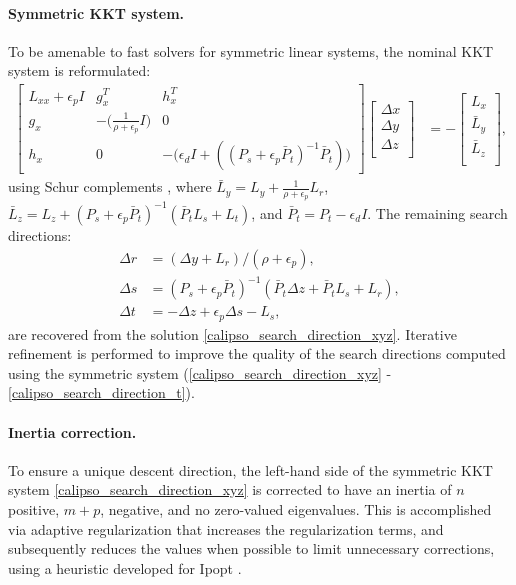 \paragraph{Symmetric KKT system.}
To be amenable to fast solvers for symmetric linear systems, the nominal KKT system is reformulated:
\begin{align} 
	\begin{bmatrix} 
		L_{xx} + \epsilon_p I & g_x^T & h_x^T \\ 
		g_x & -\Big(\frac{1}{\rho + \epsilon_p} I \Big) & 0 \\ 
		h_x & 0 & -\Big(\epsilon_d I + ((P_s + \epsilon_p \bar{P}_t)^{-1} \bar{P}_t) \Big)
	\end{bmatrix} 
	\begin{bmatrix} 
		\Delta x \\ 
		\Delta y \\ 
		\Delta z \\
	\end{bmatrix} 
	&=
	-\begin{bmatrix} 
		L_x \\ 
		\bar{L}_y\\ 
		\bar{L}_z \\
	\end{bmatrix}, \label{calipso_search_direction_xyz}
\end{align} 
using Schur complements \cite{boyd2004convex}, where $\bar{L}_y = L_y + \frac{1}{\rho + \epsilon_p} L_r$, $\bar{L}_z = L_z + (P_s + \epsilon_p \bar{P}_t)^{-1}(\bar{P}_t L_s + L_t)$, and $\bar{P}_t = P_t - \epsilon_d I$. The remaining search directions:
\begin{align} 
	\Delta r &= (\Delta y + L_r) / (\rho + \epsilon_p), \label{calipso_search_direction_r}\\
	\Delta s &= (P_s + \epsilon_p \bar{P}_t)^{-1} (\bar{P}_t \Delta z + \bar{P}_t L_s + L_r), \label{calipso_search_direction_s}\\
	\Delta t &= - \Delta z + \epsilon_p \Delta s - L_s, \label{calipso_search_direction_t}
\end{align}
are recovered from the solution \eqref{calipso_search_direction_xyz}. 
Iterative refinement \cite{nocedal2006numerical} is performed to improve the quality of the search directions computed using the symmetric system (\ref{calipso_search_direction_xyz} - \ref{calipso_search_direction_t}).

\paragraph{Inertia correction.}
To ensure a unique descent direction, the left-hand side of the symmetric KKT system \eqref{calipso_search_direction_xyz} is corrected to have an inertia of $n$ positive, $m + p$, negative, and no zero-valued eigenvalues. This is accomplished via adaptive regularization that increases the regularization terms, and subsequently reduces the values when possible to limit unnecessary corrections, using a heuristic developed for Ipopt \cite{wachter2006implementation}.

